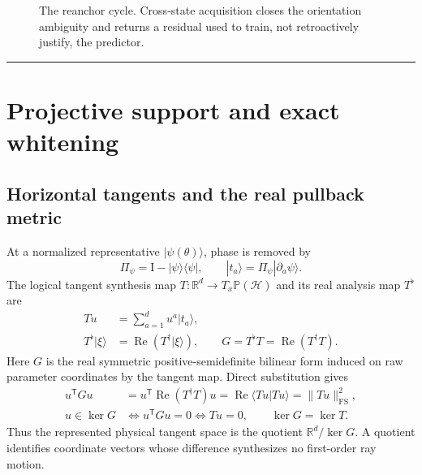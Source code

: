 \documentclass[10pt,twocolumn]{article}
\theoremstyle{definition}
\theoremstyle{remark}
\newcommand{\conceptbreak}{\par\vspace{0.45em}\noindent\textcolor{navy!55}{\rule{\columnwidth}{0.35pt}}\vspace{0.35em}\par}
\newcommand{\R}{\mathbb R}
\newcommand{\Hh}{\mathcal H}
\newcommand{\Pj}{\mathbb P}
\newcommand{\Id}{\mathrm I}
\newcommand{\Rea}{\operatorname{Re}}
\newcommand{\FS}{\mathrm{FS}}
\begin{document}
\begin{figure}[t]
\centering
{}
\caption{The reanchor cycle.  Cross-state acquisition closes the orientation ambiguity and returns a residual used to train, not retroactively justify, the predictor.}
\label{fig:reanchor}
\end{figure}

\conceptbreak

\section{Projective support and exact whitening}
\label{sec:support}

\subsection{Horizontal tangents and the real pullback metric}

At a normalized representative $|\psi(\theta)\rangle$, phase is removed by
\begin{equation}
 \Pi_\psi=\Id-|\psi\rangle\langle\psi|,
 \qquad |t_a\rangle=\Pi_\psi|\partial_a\psi\rangle.
 \label{eq:horizontal}
\end{equation}
The logical tangent synthesis map $T:\R^d\to T_x\Pj(\Hh)$ and its real analysis map $T^\flat$ are
\begin{align}
 Tu&=\sum_{a=1}^d u^a|t_a\rangle,\nonumber\\
 T^\flat|\xi\rangle&=\Rea(T^\dagger|\xi\rangle),
 \qquad G=T^\flat T=\Rea(T^\dagger T).
 \label{eq:synthesisanalysis}
\end{align}
Here $G$ is the real symmetric positive-semidefinite bilinear form induced on raw parameter coordinates by the tangent map.  Direct substitution gives
\begin{align}
 u^{\mathsf T}Gu
 &=u^{\mathsf T}\Rea(T^\dagger T)u
 =\Rea\langle Tu|Tu\rangle
 =\|Tu\|_{\FS}^2,\nonumber\\
 u\in\ker G
 &\Longleftrightarrow u^{\mathsf T}Gu=0
 \Longleftrightarrow Tu=0,
 \qquad \ker G=\ker T.
 \label{eq:kernel}
\end{align}
Thus the represented physical tangent space is the quotient $\R^d/\ker G$.  A quotient identifies coordinate vectors whose difference synthesizes no first-order ray motion.
\end{document}
